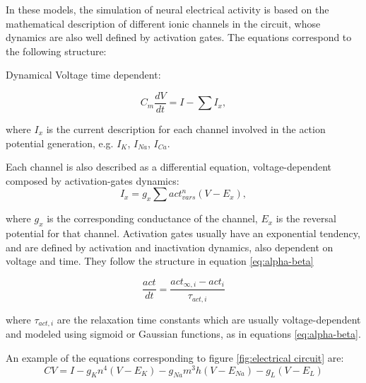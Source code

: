 In these models, the simulation of neural electrical activity is based on the mathematical description of different ionic channels in the circuit, whose dynamics are also well defined by activation gates. The equations correspond to the following structure:

Dynamical Voltage time dependent:

\begin{equation}
 C_m \frac{dV}{dt} = I - \sum I_{x},
\end{equation}

where $I_{x}$ is the current description for each channel involved in the action potential generation, e.g. $I_K$, $I_{Na}$, $I_{Ca}$.

Each channel is also described as a differential equation, voltage-dependent composed by activation-gates dynamics:
\begin{equation}
I_x =  g_x \sum act_{vars}^n (V - E_x), 
\end{equation}

where $g_x$ is the corresponding conductance of the channel, $E_x$ is the reversal potential for that channel.
Activation gates usually have an exponential tendency, and are defined by activation and inactivation dynamics, also dependent on voltage and time. They follow the structure in equation \ref{eq:alpha-beta}

\begin{equation}
	\label{eq:alpha-beta}
	\frac{act}{dt} = \frac{act_{\infty,i}-act_i}{\tau_{act,i}}
\end{equation}

where $\tau_{act,i}$ are the relaxation time constants which are usually voltage-dependent and modeled using sigmoid or Gaussian functions, as in equations \ref{eq:alpha-beta}. 


 An example of the equations corresponding to figure \ref{fig:electrical circuit} are:
\begin{equation}
		C V = I - g_K n^4 (V - E_K) - g_{Na} m^3h(V-E_{Na}) - g_L (V-E_L)
\end{equation}

